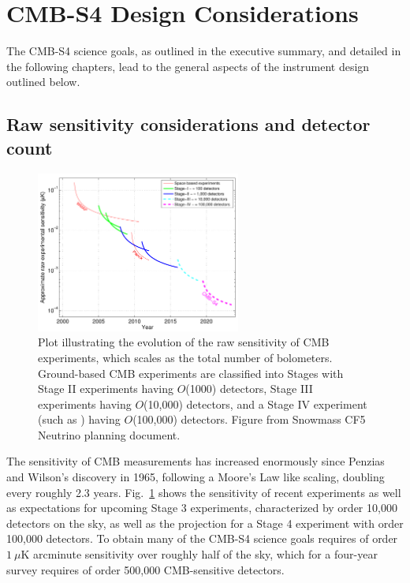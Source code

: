\section{CMB-S4 Design Considerations}

The CMB-S4 science goals, as outlined in the executive summary, and detailed in the following chapters, lead to the general aspects of the instrument design outlined below.  



\subsection{Raw sensitivity considerations and detector count}

\begin{figure}[t]
\centering \includegraphics[width=0.6\textwidth]{Intro/expt_progress.pdf}
\caption{Plot illustrating the evolution of the raw sensitivity of CMB
  experiments, which scales as the total number of
  bolometers. Ground-based CMB experiments are classified into Stages
  with Stage II experiments having $O$(1000) detectors, Stage III
  experiments having $O$(10,000) detectors, and a Stage IV experiment
  (such as \cmbexp) having $O$(100,000) detectors. Figure from Snowmass  CF5
  Neutrino planning document.}
\label{fig:expt_progress-intro}
\end{figure}

The sensitivity of CMB measurements has increased enormously since Penzias and Wilson's discovery in 1965, following a Moore's Law like scaling, doubling every roughly 2.3 years. Fig.~\ref{fig:expt_progress-intro} shows the sensitivity of recent experiments as well as expectations for upcoming Stage 3 experiments, characterized by order 10,000 detectors on the sky, as well as the projection for a Stage 4 experiment with order 100,000 detectors. To obtain many of the CMB-S4 science goals requires of order $1~\mu$K arcminute sensitivity over roughly half of the sky, which for a four-year survey requires of order 500,000 CMB-sensitive detectors. 

